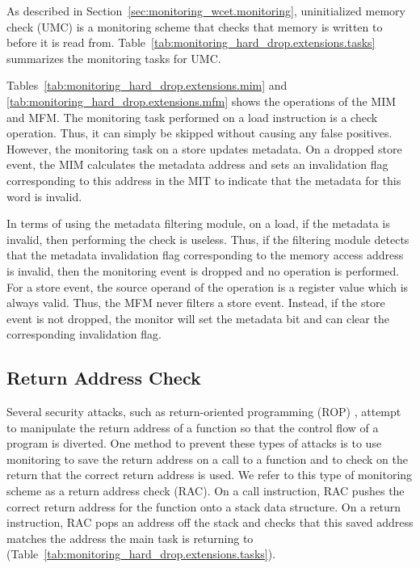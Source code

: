 As described in Section~\ref{sec:monitoring_wcet.monitoring},
uninitialized memory check (UMC) is a monitoring scheme that checks that memory
is written to before it is read from.
Table~\ref{tab:monitoring_hard_drop.extensions.tasks} summarizes the monitoring
tasks for UMC.

Tables~\ref{tab:monitoring_hard_drop.extensions.mim} and
\ref{tab:monitoring_hard_drop.extensions.mfm} shows the operations of
the MIM and MFM. The monitoring task performed on a load instruction is a check
operation.  Thus, it can simply be skipped without causing any false positives.
However, the monitoring task on a store updates metadata. On a dropped store
event, the MIM calculates the metadata address and sets an invalidation flag
corresponding to this address in the MIT to indicate that the metadata for this
word is invalid.

In terms of using the metadata filtering module, on a load, if the metadata is
invalid, then performing the check is useless. Thus, if the filtering module
detects that the metadata invalidation flag corresponding to the memory access
address is invalid, then the monitoring event is dropped and no operation is
performed.  For a store event, the source operand of the operation is a
register value which is always valid. Thus, the MFM never filters a store
event. Instead, if the store event is not dropped, the monitor will set the
metadata bit and can clear the corresponding invalidation flag.

\subsection{Return Address Check}
\label{sec:monitoring_hard_drop.extensions.lrc}

Several security attacks, such as return-oriented programming (ROP)
\cite{rop-ccs07}, attempt to manipulate the return address of a
function so that the control flow of a program is diverted. One method to
prevent these types of attacks is to use monitoring to save the return address
on a call to a function and to check on the return that the correct return
address is used. We refer to this type of monitoring scheme as a return address
check (RAC). On a call instruction, RAC pushes the correct return address for
the function onto a stack data structure. On a return instruction, RAC pops an
address off the stack and checks that this saved address matches the address the
main task is returning to (Table~\ref{tab:monitoring_hard_drop.extensions.tasks}).

